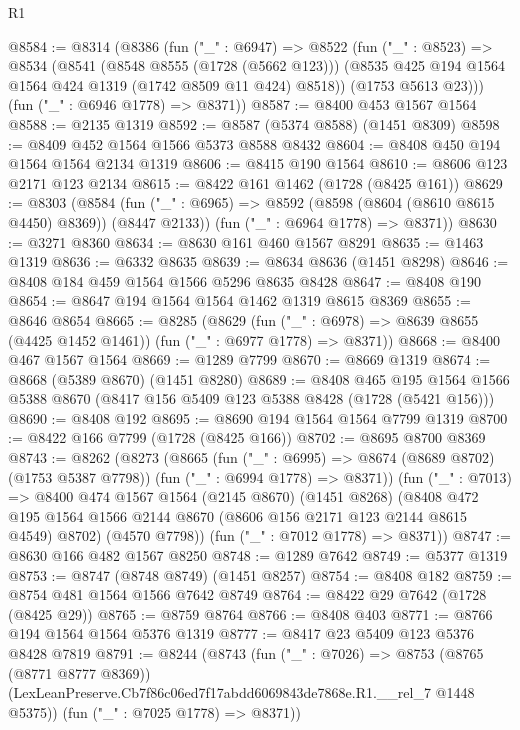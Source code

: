 \begin{lexlean}{R1}
\begin{coremodule}
@8584 := @8314
    (@8386
      (fun ("_" : @6947) =>
      @8522
        (fun ("_" : @8523) =>
        @8534
          (@8541
            (@8548 @8555 (@1728 (@5662 @123)))
            (@8535 @425 @194 @1564 @1564 @424 @1319 (@1742 @8509 @11 @424) @8518))
          (@1753 @5613 @23)))
      (fun ("_" : @6946 @1778) => @8371))
@8587 := @8400 @453 @1567 @1564
@8588 := @2135 @1319
@8592 := @8587 (@5374 @8588) (@1451 @8309)
@8598 := @8409 @452 @1564 @1566 @5373 @8588 @8432
@8604 := @8408 @450 @194 @1564 @1564 @2134 @1319
@8606 := @8415 @190 @1564
@8610 := @8606 @123 @2171 @123 @2134
@8615 := @8422 @161 @1462 (@1728 (@8425 @161))
@8629 := @8303
    (@8584
      (fun ("_" : @6965) => @8592 (@8598 (@8604 (@8610 @8615 @4450) @8369)) (@8447 @2133))
      (fun ("_" : @6964 @1778) => @8371))
@8630 := @3271 @8360
@8634 := @8630 @161 @460 @1567 @8291
@8635 := @1463 @1319
@8636 := @6332 @8635
@8639 := @8634 @8636 (@1451 @8298)
@8646 := @8408 @184 @459 @1564 @1566 @5296 @8635 @8428
@8647 := @8408 @190
@8654 := @8647 @194 @1564 @1564 @1462 @1319 @8615 @8369
@8655 := @8646 @8654
@8665 := @8285
    (@8629
      (fun ("_" : @6978) => @8639 @8655 (@4425 @1452 @1461))
      (fun ("_" : @6977 @1778) => @8371))
@8668 := @8400 @467 @1567 @1564
@8669 := @1289 @7799
@8670 := @8669 @1319
@8674 := @8668 (@5389 @8670) (@1451 @8280)
@8689 := @8408
    @465
    @195
    @1564
    @1566
    @5388
    @8670
    (@8417 @156 @5409 @123 @5388 @8428 (@1728 (@5421 @156)))
@8690 := @8408 @192
@8695 := @8690 @194 @1564 @1564 @7799 @1319
@8700 := @8422 @166 @7799 (@1728 (@8425 @166))
@8702 := @8695 @8700 @8369
@8743 := @8262
    (@8273
      (@8665
        (fun ("_" : @6995) => @8674 (@8689 @8702) (@1753 @5387 @7798))
        (fun ("_" : @6994 @1778) => @8371))
      (fun ("_" : @7013) =>
      @8400
        @474
        @1567
        @1564
        (@2145 @8670)
        (@1451 @8268)
        (@8408 @472 @195 @1564 @1566 @2144 @8670 (@8606 @156 @2171 @123 @2144 @8615 @4549) @8702)
        (@4570 @7798))
      (fun ("_" : @7012 @1778) => @8371))
@8747 := @8630 @166 @482 @1567 @8250
@8748 := @1289 @7642
@8749 := @5377 @1319
@8753 := @8747 (@8748 @8749) (@1451 @8257)
@8754 := @8408 @182
@8759 := @8754 @481 @1564 @1566 @7642 @8749
@8764 := @8422 @29 @7642 (@1728 (@8425 @29))
@8765 := @8759 @8764
@8766 := @8408 @403
@8771 := @8766 @194 @1564 @1564 @5376 @1319
@8777 := @8417 @23 @5409 @123 @5376 @8428 @7819
@8791 := @8244
    (@8743
      (fun ("_" : @7026) =>
      @8753
        (@8765 (@8771 @8777 @8369))
        (LexLeanPreserve.Cb7f86c06ed7f17abdd6069843de7868e.R1.__rel_7 @1448 @5375))
      (fun ("_" : @7025 @1778) => @8371))

\end{coremodule}
\end{lexlean}
